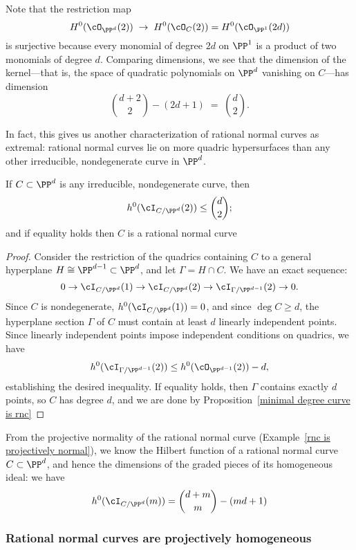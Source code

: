 Note that
the restriction map
$$
H^0(\cO_{\PP^d}(2)) \; \to \; H^0(\cO_{C}(2)) = H^0(\cO_{\PP^1}(2d))
$$
 is surjective  because every monomial of degree $2d$ on $\PP^1$ is a product of two monomials of degree $d$. Comparing dimensions, we see that the dimension of the kernel---that is, the space of quadratic polynomials on $\PP^d$ vanishing on $C$---has dimension
$$
\binom{d+2}{2} - (2d+1) \; = \; \binom{d}{2}.
$$


In fact, this gives us another characterization of rational normal curves as extremal: rational normal curves lie on more quadric hypersurfaces than any other irreducible, nondegenerate curve in $\PP^d$.

\begin{proposition}\label{rnc on most quadrics}
If $C \subset \PP^d$ is any irreducible, nondegenerate curve, then
$$
h^0(\cI_{C/\PP^d}(2)) \leq  \binom{d}{2};
$$
and if equality holds then $C$ is a rational normal curve
\end{proposition}

\begin{proof}
Consider the restriction of the quadrics containing $C$ to a general hyperplane $H \cong \PP^{d-1} \subset \PP^d$, and let $\Gamma = H \cap C$. We have an exact sequence:
$$
0 \to \cI_{C/\PP^d}(1) \to \cI_{C/\PP^d}(2) \to \cI_{\Gamma/\PP^{d-1}}(2) \to 0.
$$ 
Since $C$ is nondegenerate, $h^0(\cI_{C/\PP^d}(1)) = 0$, and since $\deg C \geq d$, the hyperplane section $\Gamma$ of $C$ must contain at least $d$ linearly independent points. Since linearly independent points impose independent conditions on quadrics, we have
$$
h^0(\cI_{\Gamma/\PP^{d-1}}(2)) \leq h^0(\cO_{\PP^{d-1}}(2)) - d,
$$
establishing the desired inequality. If equality holds, then $\Gamma$ contains exactly $d$ points, so
$C$ has degree $d$, and we are done by Proposition~\ref{minimal degree curve is rnc}
\end{proof}


From the projective normality of the rational normal curve (Example~\ref{rnc is projectively normal}), we know the Hilbert function of a rational normal curve $C \subset \PP^d$, and hence the dimensions of the graded pieces of its homogeneous ideal: we have
$$
h^0(\cI_{C/\PP^d}(m)) =  \binom{d+m}{m} - (md+1)
$$


\subsubsection{Rational normal curves are projectively homogeneous}

